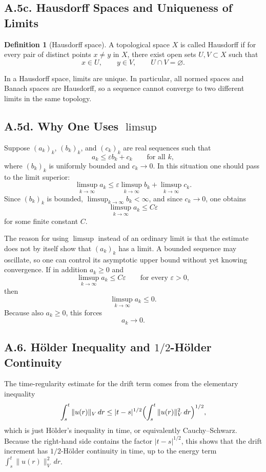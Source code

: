 \documentclass[11pt]{article}
\theoremstyle{definition}
\newtheorem{definition}{Definition}
\theoremstyle{remark}
\begin{document}
\subsection*{A.5c. Hausdorff Spaces and Uniqueness of Limits}
\begin{definition}[Hausdorff space]
A topological space $X$ is called Hausdorff if for every pair of distinct points $x\neq y$ in $X$, there exist open sets $U,V\subset X$ such that
\[
  x\in U,\qquad y\in V,\qquad U\cap V=\varnothing.
\]
\end{definition}

In a Hausdorff space, limits are unique. In particular, all normed spaces and Banach spaces are Hausdorff, so a sequence cannot converge to two different limits in the same topology.

\subsection*{A.5d. Why One Uses $\limsup$}
Suppose $(a_k)_k$, $(b_k)_k$, and $(c_k)_k$ are real sequences such that
\[
  a_k\le \varepsilon b_k+c_k
  \qquad \text{for all } k,
\]
where $(b_k)_k$ is uniformly bounded and $c_k\to 0$. In this situation one should pass to the limit superior:
\[
  \limsup_{k\to\infty} a_k
  \le
  \varepsilon \limsup_{k\to\infty} b_k
  +
  \limsup_{k\to\infty} c_k.
\]
Since $(b_k)_k$ is bounded, $\limsup_{k\to\infty} b_k<\infty$, and since $c_k\to 0$, one obtains
\[
  \limsup_{k\to\infty} a_k\le C\varepsilon
\]
for some finite constant $C$.

The reason for using $\limsup$ instead of an ordinary limit is that the estimate does not by itself show that $(a_k)_k$ has a limit. A bounded sequence may oscillate, so one can control its asymptotic upper bound without yet knowing convergence. If in addition $a_k\ge 0$ and
\[
  \limsup_{k\to\infty} a_k\le C\varepsilon
  \qquad \text{for every } \varepsilon>0,
\]
then
\[
  \limsup_{k\to\infty} a_k\le 0.
\]
Because also $a_k\ge 0$, this forces
\[
  a_k\to 0.
\]

\subsection*{A.6. H\"older Inequality and $1/2$-H\"older Continuity}
The time-regularity estimate for the drift term comes from the elementary inequality
\[
  \int_s^t \|u(r)\|_V\,dr
  \le
  |t-s|^{1/2}
  \Bigl(\int_s^t \|u(r)\|_V^2\,dr\Bigr)^{1/2},
\]
which is just H\"older's inequality in time, or equivalently Cauchy--Schwarz. Because the right-hand side contains the factor $|t-s|^{1/2}$, this shows that the drift increment has $1/2$-H\"older continuity in time, up to the energy term $\int_s^t \|u(r)\|_V^2\,dr$.
\end{document}
